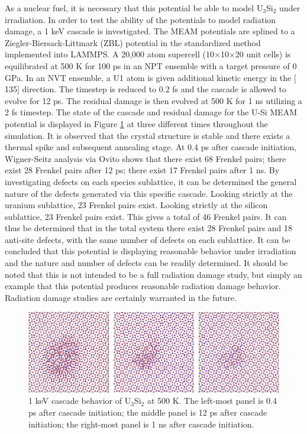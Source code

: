\documentclass[review]{elsarticle}
\begin{document}
As a nuclear fuel, it is necessary that this potential be able to model U$_{3}$Si$_{2}$ under irradiation.  In order to test the ability of the potentials to model radiation damage, a 1 keV cascade is investigated.   The MEAM potentials are splined to a Ziegler-Biersack-Littmark (ZBL) \cite{zbl} potential in the standardized method implemented into LAMMPS.  A 20,000 atom supercell (10$\times$10$\times$20 unit cells) is equilibrated at 500 K for 100 ps in an NPT ensemble with a target pressure of 0 GPa.  In an NVT ensemble, a U1 atom is given additional kinetic energy in the $[$135$]$ direction.  The timestep is reduced to 0.2 fs and the cascade is allowed to evolve for 12 ps.  The residual damage is then evolved at 500 K for 1 ns utilizing a 2 fs timestep.  The state of the cascade and residual damage for the U-Si MEAM potential is displayed in Figure \ref{fig:ben6} at three different times throughout the simulation.  It is observed that the crystal structure is stable and there exists a thermal spike and subsequent annealing stage.  At 0.4 ps after cascade initiation, Wigner-Seitz analysis via Ovito \cite{ovito} shows that there exist 68 Frenkel pairs; there exist 28 Frenkel pairs after 12 ps; there exist 17 Frenkel pairs after 1 ns.  By investigating defects on each species sublattice, it can be determined the general nature of the defects generated via this specific cascade.  Looking strictly at the uranium sublattice, 23 Frenkel pairs exist.  Looking strictly at the silicon sublattice, 23 Frenkel pairs exist.  This gives a total of 46 Frenkel pairs.  It can thus be determined that in the total system there exist 28 Frenkel pairs and 18 anti-site defects, with the same number of defects on each sublattice.  It can be concluded that this potential is displaying reasonable behavior under irradiation and the nature and number of defects can be readily determined.  It should be noted that this is not intended to be a full radiation damage study, but simply an example that this potential produces reasonable radiation damage behavior.  Radiation damage studies are certainly warranted in the future.  

 \begin{figure}[bt]
	\centering
	\includegraphics[width=\textwidth]{cascade_total.png}
    \caption{1 keV cascade behavior of U$_{3}$Si$_{2}$ at 500 K.  The left-most panel is 0.4 ps after cascade initiation; the middle panel is 12 ps after cascade initiation; the right-most panel is 1 ns after cascade initiation.}\label{fig:ben6}
\end{figure}
\end{document}
